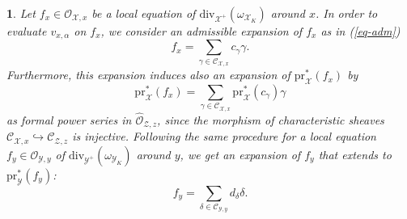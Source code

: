 \documentclass{amsart}%
\numberwithin{equation}{subsection}
\theoremstyle{plain2}
\theoremstyle{definition2}
\theoremstyle{stepstyle}
\theoremstyle{point}
\theoremstyle{subpoint}
\newtheorem{subpoint}[equation]{}%
\newcommand{\spa}[1]{\begin{subpoint}#1\end{subpoint}}           %
\newcommand{\cX}{\ensuremath{\mathscr{X}}}
\newcommand{\caC}{\ensuremath{\mathcal{C}}}
\newcommand{\caO}{\ensuremath{\mathcal{O}}}
\newcommand{\cY}{\ensuremath{\mathscr{Y}}}
\newcommand{\cZ}{\ensuremath{\mathscr{Z}}}
\renewcommand{\cZ}{\ensuremath{\mathscr{Z}}}
\renewcommand{\cY}{\ensuremath{\mathscr{Y}}}
\newcommand{\pr}{\mathrm{pr}}
\newcommand{\divisor}{\mathrm{div}}
\begin{document}
\spa{Let $f_x \in \caO_{\cX,x}$ be a local equation of $\divisor_{\cX^+}(\omega_{\cX_K})$ around $x$. In order to evaluate $v_{x,\alpha}$ on $f_x$, we consider an admissible expansion of $f_x$ as in (\ref{eq-adm}) $$f_x=\sum_{\gamma\in \caC_{\cX,x}}c_\gamma \gamma.$$ Furthermore, this expansion induces also an expansion of $\pr_{\cX}^*(f_x)$ by  $$\pr_{\cX}^*(f_x)=\sum_{\gamma\in \caC_{\cX,x} }\pr^*_{\cX}(c_\gamma) \gamma$$ as formal power series in $\widehat{\caO}_{\cZ,z}$, since the morphism of characteristic sheaves $\mathcal{C}_{\cX,x} \hookrightarrow \mathcal{C}_{\cZ,z}$ is injective. Following the same procedure for a local equation $f_y \in \caO_{\cY,y}$ of $\divisor_{\cY^+}(\omega_{\cY_K})$ around $y$, we get an expansion of $f_y$ that extends to $\pr_{\cY}^*(f_y)$: 
$$f_y=\sum_{\delta\in \caC_{\cY,y}}d_\delta \delta.$$}
\end{document}
